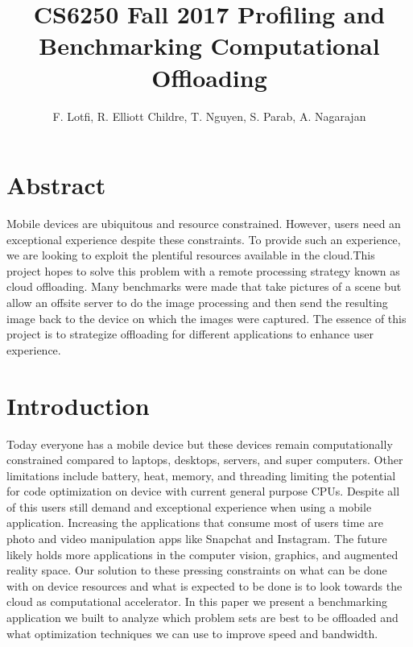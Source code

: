\documentclass{sig-alternate}
\title{CS6250 Fall 2017 
Profiling and Benchmarking Computational Offloading}
\author{F. Lotfi, R. Elliott Childre, T. Nguyen, S. Parab, A. Nagarajan  }
\begin{document}
\maketitle


\section{Abstract}
Mobile devices are ubiquitous and resource constrained.
However, users need an exceptional experience despite these constraints. To provide such an experience, we are looking to exploit the plentiful resources available in the cloud.This project hopes to solve this problem with a remote processing strategy known as cloud offloading. Many benchmarks were made that take pictures of a scene but allow an offsite server to do the image processing and then send the resulting image back to the device on which the images were captured.
The essence of this project is to strategize offloading for different applications to enhance user experience.

\section{Introduction}
Today everyone has a mobile device but these devices remain computationally constrained compared to laptops, desktops, servers, and super computers. Other limitations include battery, heat, memory, and threading limiting the potential for code optimization on device with current general purpose CPUs. Despite all of this users still demand and exceptional experience when using a mobile application. Increasing the applications that consume most of users time are photo and video manipulation apps like Snapchat and Instagram. The future likely holds more applications in the computer vision, graphics, and augmented reality space. Our solution to these pressing constraints on what can be done with on device resources and what is expected to be done is to look towards the cloud as computational accelerator. In this paper we present a benchmarking application we built to analyze which problem sets are best to be offloaded and what optimization techniques we can use to improve speed and bandwidth.
\end{document}
